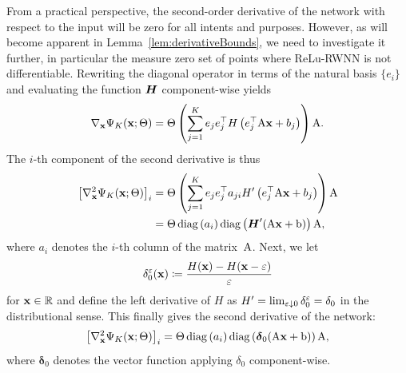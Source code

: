 From a practical perspective, the second-order derivative of the network with respect to the input will be zero for all intents and purposes. 
However, as will become apparent in Lemma~\ref{lem:derivativeBounds}, we need to investigate it further, in particular the measure zero set of points where ReLu-RWNN is not differentiable. Rewriting the diagonal operator in terms of the natural basis $\{e_{i}\}$ and evaluating the function $\boldsymbol{H}$ component-wise yields
$$
\nabla_{\mathbf{x}}\Psi_K(\mathbf{x}; \Theta)=\Theta \left(\sum_{j=1}^{K} e_{j} e_{j}^\top H\left(e_{j}^\top \mathrm{A} \mathbf{x}+b_{j}\right) \right) \mathrm{A}.
$$
The $i$-th component of the second derivative is thus
\begin{align*}
\left[\nabla_{\mathbf{x}}^2\Psi_K(\mathbf{x}; \Theta)\right]_i
&= \Theta\left( \sum_{j=1}^{K} e_{j} e_{j}^\top a_{j i}H'\left(e_{j}^\top \mathrm{A} \mathbf{x}+b_{j}\right)\right)\mathrm{A} \\
&= \Theta \operatorname{diag} \left(a_{i}\right) \operatorname{diag} \left(\boldsymbol{H}'(\mathrm{A} \mathbf{x}+\mathrm{b})\right) \mathrm{A},
\end{align*}
where $a_i$ denotes the $i$-th column of the matrix~$\mathrm{A}$. 
Next, we let
$$\delta_0^{\varepsilon}(\mathbf{x}) \coloneqq \frac{H(\mathbf{x})-H(\mathbf{x}-\varepsilon)}{\varepsilon}$$
for $\mathbf{x}\in\mathbb{R}$ and define the left derivative of $H$ as $H'=\lim_{\varepsilon\downarrow 0}\delta_0^\varepsilon=\delta_0$ in the distributional sense. This finally gives the second derivative of the network:
$$
\left[\nabla_{\mathbf{x}}^2\Psi_K(\mathbf{x}; \Theta)\right]_i
 = \Theta\operatorname{diag}\left(a_{i}\right)\operatorname{diag}\left(\boldsymbol\delta_0(\mathrm{A} \mathbf{x}+\mathrm{b})\right) \mathrm{A},
$$
where $\boldsymbol \delta_0$ denotes the vector function applying $\delta_0$ component-wise.


